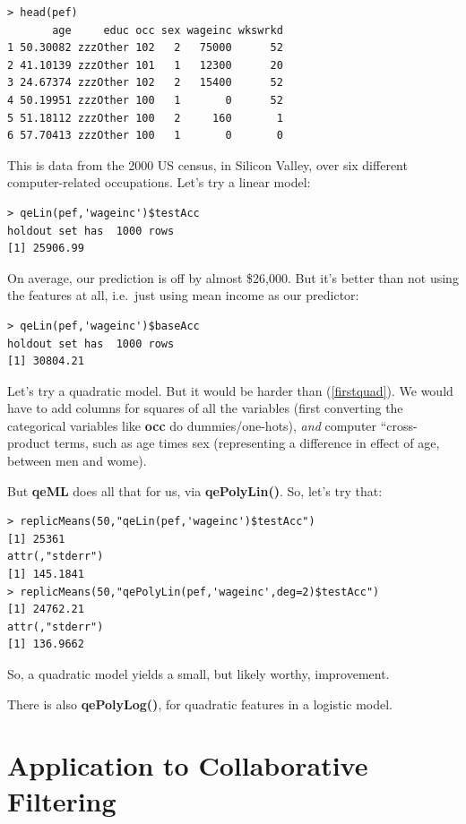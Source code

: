 \begin{lstlisting}
> head(pef)
       age     educ occ sex wageinc wkswrkd
1 50.30082 zzzOther 102   2   75000      52
2 41.10139 zzzOther 101   1   12300      20
3 24.67374 zzzOther 102   2   15400      52
4 50.19951 zzzOther 100   1       0      52
5 51.18112 zzzOther 100   2     160       1
6 57.70413 zzzOther 100   1       0       0
\end{lstlisting}

This is data from the 2000 US census, in Silicon Valley, over six
different computer-related occupations.  Let's try a linear model:

\begin{lstlisting}
> qeLin(pef,'wageinc')$testAcc
holdout set has  1000 rows
[1] 25906.99
\end{lstlisting}

On average, our prediction is off by almost \$26,000.  But it's better
than not using the features at all, i.e.\ just using mean income as our
predictor:

\begin{lstlisting}
> qeLin(pef,'wageinc')$baseAcc
holdout set has  1000 rows
[1] 30804.21
\end{lstlisting}

Let's try a quadratic model.  But it would be harder than
(\ref{firstquad}).  We would have to add columns for squares of all the 
variables (first converting the categorical variables like \textbf{occ} 
do dummies/one-hots), \textit{and} computer ``cross-product terms, such
as age times sex (representing a difference in effect of age, between
men and wome).

But \textbf{qeML} does all that for us, via \textbf{qePolyLin()}.  So,
let's try that:

\begin{lstlisting}
> replicMeans(50,"qeLin(pef,'wageinc')$testAcc")
[1] 25361
attr(,"stderr")
[1] 145.1841
> replicMeans(50,"qePolyLin(pef,'wageinc',deg=2)$testAcc")
[1] 24762.21
attr(,"stderr")
[1] 136.9662
\end{lstlisting}

So, a quadratic model yields a small, but likely worthy, improvement.

There is also \textbf{qePolyLog()}, for quadratic features in a logistic
model.

\section{Application to Collaborative Filtering}

